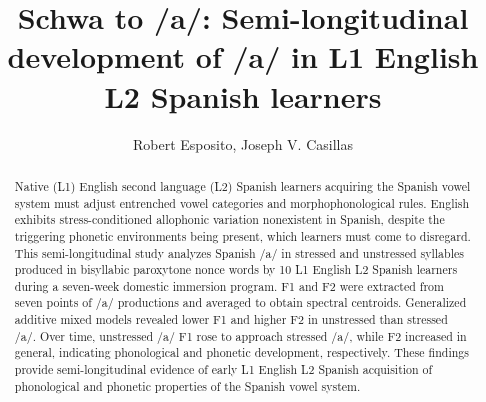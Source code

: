 \title{Schwa to /\protect\MakeLowercase{a}/: Semi-longitudinal development of /\protect\MakeLowercase{a}/ in L1 English L2 Spanish learners}
\author{Robert Esposito, Joseph V. Casillas}


\maketitle

\begin{abstract}
Native (L1) English second language (L2) Spanish learners acquiring the Spanish vowel system must adjust entrenched vowel categories and morphophonological rules. English exhibits stress-conditioned allophonic variation nonexistent in Spanish, despite the triggering phonetic environments being present, which learners must come to disregard. This semi-longitudinal study analyzes Spanish /a/ in stressed and unstressed syllables produced in bisyllabic paroxytone nonce words by 10 L1 English L2 Spanish learners during a seven-week domestic immersion program. F1 and F2 were extracted from seven points of /a/ productions and averaged to obtain spectral centroids. Generalized additive mixed models revealed lower F1 and higher F2 in unstressed than stressed /a/. Over time, unstressed /a/ F1 rose to approach stressed /a/, while F2 increased in general, indicating phonological and phonetic development, respectively. These findings provide semi-longitudinal evidence of early L1 English L2 Spanish acquisition of phonological and phonetic properties of the Spanish vowel system.
\end{abstract}


